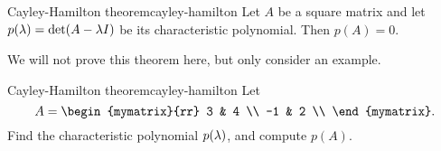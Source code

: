 \begin{theorem}{Cayley-Hamilton theorem}{cayley-hamilton}
  Let $A$ be a square matrix and let $p(\lambda)=\det(A-\lambda
  I)$ be its characteristic polynomial. Then $p(A)=0$.
\end{theorem}

We will not prove this theorem here, but only consider an example.

\begin{example}{Cayley-Hamilton theorem}{cayley-hamilton}
  Let
  \begin{equation*}
    A = \begin{mymatrix}{rr}
      3 & 4 \\
      -1 & 2 \\
    \end{mymatrix}.
  \end{equation*}
  Find the characteristic polynomial $p(\lambda)$, and compute
  $p(A)$.
\end{example}

